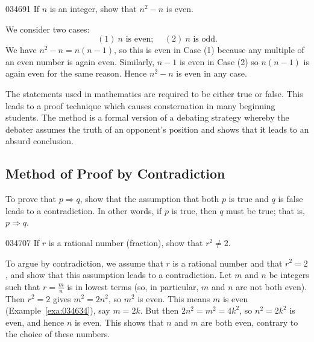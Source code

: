 \begin{example}{}{034691}
If $n$ is an integer, show that $n^{2} - n$ is even.


\begin{solution}
  We consider two cases:
\begin{equation*}
(1) \ n \mbox{ is even; } \quad (2) \ n \mbox{ is odd.}
\end{equation*}
We have $n^{2} - n = n(n - 1)$, so this is even in Case (1) because any multiple of an even number is again even. Similarly, $n - 1$ is even in Case (2) so $n(n - 1)$ is again even for the same reason. Hence $n^{2} - n$ is even in any case.
\end{solution}
\end{example}

The statements used in mathematics are 
required to be either true or false. This leads to a proof technique 
which causes consternation in many beginning students. The method is a 
formal version of a debating strategy whereby the debater assumes the 
truth of an opponent's position and shows that it leads to an absurd 
conclusion.


\subsection*{Method of Proof by Contradiction}

To prove that $p \Rightarrow q$, show that the assumption that both $p$ is true and $q$ is false leads to a contradiction. In other words, if $p$ is true, then $q$ must be true; that is, $p \Rightarrow q$.


\begin{example}{}{034707}
If $r$ is a rational number (fraction), show that $r^{2} \neq 2$.


\begin{solution}
  To argue by contradiction, we assume that $r$ is a rational number and that $r^{2} = 2$, and show that this assumption leads to a contradiction. Let $m$ and $n$ be integers such that $r = \frac{m}{n}$ is in lowest terms (so, in particular, $m$ and $n$ are not both even). Then $r^{2} = 2$ gives $m^{2} = 2n^{2}$, so $m^{2}$ is even. This means $m$ is even (Example~\ref{exa:034634}), say $m = 2k$. But then $2n^{2} = m^{2} = 4k^{2}$, so $n^{2} = 2k^{2}$ is even, and hence $n$ is even. This shows that $n$ and $m$ are both even, contrary to the choice of these numbers.
\end{solution}
\end{example}

